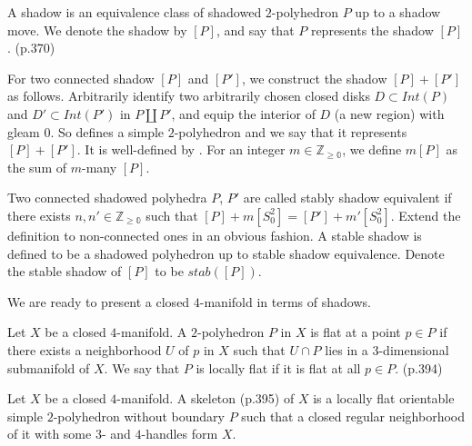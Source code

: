 \begin{definition}[shadow]\label{def/shadow}
  A shadow is an equivalence class of shadowed $2$-polyhedron $P$
  up to a shadow move. We denote the shadow by $[P]$, and say
  that $P$ represents the shadow $[P]$. (p.370)
\end{definition}

\noindent For two connected shadow $[P]$ and $[P']$, we construct
the shadow $[P]+[P']$ as follows. Arbitrarily identify two
arbitrarily chosen closed disks $D \subset Int(P)$ and
$D' \subset Int(P')$ in $P \coprod P'$, and equip the interior of
$D$ (a new region) with gleam $0$. So defines a simple
$2$-polyhedron and we say that it represents $[P]+[P']$. It is
well-defined by \cite[lemma VIII.2.1.1]{turaev-}. For an integer
$m \in \mathbb{Z_{\geq 0}}$, we define $m[P]$ as the sum of
$m$-many $[P]$.

\begin{definition}\label{def/stable-shadow}
  Two connected shadowed polyhedra $P$, $P'$ are called stably
  shadow equivalent if there exists
  $n, n' \in \mathbb{Z_{\geq 0}}$ such that
  $[P] + m[S^{2}_{0}] = [P'] + m'[S^{2}_{0}]$. Extend the
  definition to non-connected ones in an obvious fashion. A
  stable shadow is defined to be a shadowed polyhedron up to
  stable shadow equivalence. Denote the stable shadow of $[P]$ to
  be $stab([P])$.
\end{definition}

\noindent We are ready to present a closed $4$-manifold in terms
of shadows.

\begin{definition}\label{def/locally-flat-2-polyhedron-in-a-4-manifold}
  Let $X$ be a closed $4$-manifold. A $2$-polyhedron $P$ in $X$
  is flat at a point $p \in P$ if there exists a neighborhood $U$
  of $p$ in $X$ such that $U \cap P$ lies in a $3$-dimensional
  submanifold of $X$. We say that $P$ is locally flat if it is
  flat at all $p \in P$. (p.394)
\end{definition}

\begin{definition}\label{def/skeleton-of-a-4-manifold}
  Let $X$ be a closed $4$-manifold. A skeleton (p.395) of $X$ is
  a locally flat orientable simple $2$-polyhedron without
  boundary $P$ such that a closed regular neighborhood of it with
  some $3$- and $4$-handles form $X$.
\end{definition}

